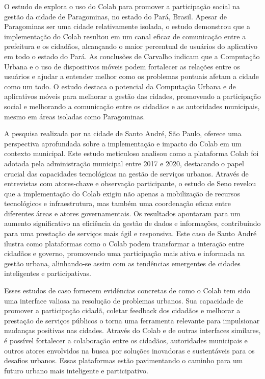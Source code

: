 O estudo de  explora o uso do Colab para promover a participação social na gestão da cidade de Paragominas, no estado do Pará, Brasil. Apesar de Paragominas ser uma cidade relativamente isolada, o estudo demonstrou que a implementação do Colab resultou em um canal eficaz de comunicação entre a prefeitura e os cidadãos, alcançando o maior percentual de usuários do aplicativo em todo o estado do Pará. As conclusões de Carvalho indicam que a Computação Urbana e o uso de dispositivos móveis podem fortalecer as relações entre os usuários e ajudar a entender melhor como os problemas pontuais afetam a cidade como um todo. O estudo destaca o potencial da Computação Urbana e de aplicativos móveis para melhorar a gestão das cidades, promovendo a participação social e melhorando a comunicação entre os cidadãos e as autoridades municipais, mesmo em áreas isoladas como Paragominas.

A pesquisa realizada por  na cidade de Santo André, São Paulo, oferece uma perspectiva aprofundada sobre a implementação e impacto do Colab em um contexto municipal. Este estudo meticuloso analisou como a plataforma Colab foi adotada pela administração municipal entre 2017 e 2020, destacando o papel crucial das capacidades tecnológicas na gestão de serviços urbanos. Através de entrevistas com atores-chave e observação participante, o estudo de Seno revelou que a implementação do Colab exigiu não apenas a mobilização de recursos tecnológicos e infraestrutura, mas também uma coordenação eficaz entre diferentes áreas e atores governamentais. Os resultados apontaram para um aumento significativo na eficiência da gestão de dados e informações, contribuindo para uma prestação de serviços mais ágil e responsiva. Este caso de Santo André ilustra como plataformas como o Colab podem transformar a interação entre cidadãos e governo, promovendo uma participação mais ativa e informada na gestão urbana, alinhando-se assim com as tendências emergentes de cidades inteligentes e participativas.

Esses estudos de caso fornecem evidências concretas de como o Colab tem sido uma interface valiosa na resolução de problemas urbanos. Sua capacidade de promover a participação cidadã, coletar feedback dos cidadãos e melhorar a prestação de serviços públicos o torna uma ferramenta relevante para impulsionar mudanças positivas nas cidades. Através do Colab e de outras interfaces similares, é possível fortalecer a colaboração entre os cidadãos, autoridades municipais e outros atores envolvidos na busca por soluções inovadoras e sustentáveis para os desafios urbanos. Essas plataformas estão pavimentando o caminho para um futuro urbano mais inteligente e participativo.

